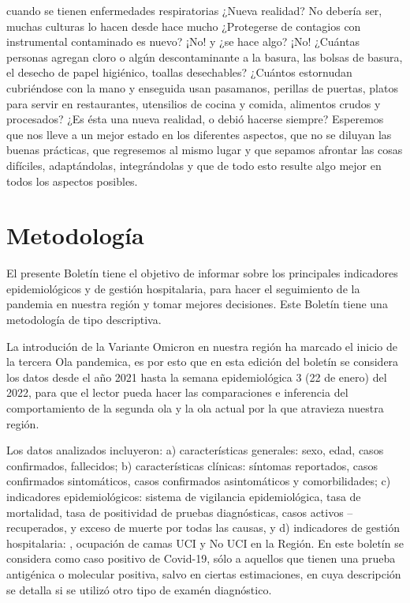 \documentclass[12pt,a4paper,openany]{book}
\begin{document}
cuando se tienen enfermedades respiratorias ¿Nueva realidad? No debería ser, muchas culturas lo hacen desde hace mucho ¿Protegerse de contagios con instrumental contaminado es nuevo? ¡No! y ¿se hace algo? ¡No! ¿Cuántas personas agregan cloro o algún descontaminante a la basura, las bolsas de basura, el desecho de papel higiénico, toallas desechables? ¿Cuántos estornudan cubriéndose con la mano y enseguida usan pasamanos, perillas de puertas, platos para servir en restaurantes, utensilios de cocina y comida, alimentos crudos y procesados? ¿Es ésta una nueva realidad, o debió hacerse siempre? Esperemos que nos lleve a un mejor estado en los diferentes aspectos, que no se diluyan las buenas prácticas, que regresemos al mismo lugar y que sepamos afrontar las cosas difíciles, adaptándolas, integrándolas y que de todo esto resulte algo mejor en todos los aspectos posibles.


	
	
	
	\clearpage
	
	\section*{Metodología}	
	\noindent El presente Boletín tiene el objetivo de informar sobre los principales indicadores epidemiológicos y de gestión hospitalaria,  para hacer el seguimiento de la pandemia en nuestra región y tomar mejores decisiones. Este Boletín tiene una metodología de tipo descriptiva. 
	
	La introdución de la Variante Omicron en nuestra región ha marcado el inicio de la tercera Ola pandemica, es por esto que en esta edición del boletín se considera los datos desde el año 2021 hasta la semana epidemiológica 3 (22 de enero) del 2022, para que el lector pueda hacer las comparaciones e inferencia del comportamiento de la segunda ola y la ola actual por la que atravieza nuestra región. 
	
	Los datos analizados incluyeron: a) características generales: sexo, edad, casos confirmados, fallecidos; b) características clínicas: síntomas reportados, casos confirmados sintomáticos, casos confirmados asintomáticos y comorbilidades; c) indicadores epidemiológicos: sistema de vigilancia epidemiológica, tasa de mortalidad, tasa de positividad de pruebas diagnósticas, casos activos – recuperados, y exceso de muerte por todas las causas, y d) indicadores de gestión hospitalaria: , ocupación de camas UCI y No UCI en la Región. En este boletín se considera como caso positivo de Covid-19, sólo a aquellos que tienen una prueba antigénica o molecular positiva, salvo en ciertas estimaciones, en cuya descripción se detalla si se utilizó otro tipo de examén diagnóstico. 
	
\end{document}
